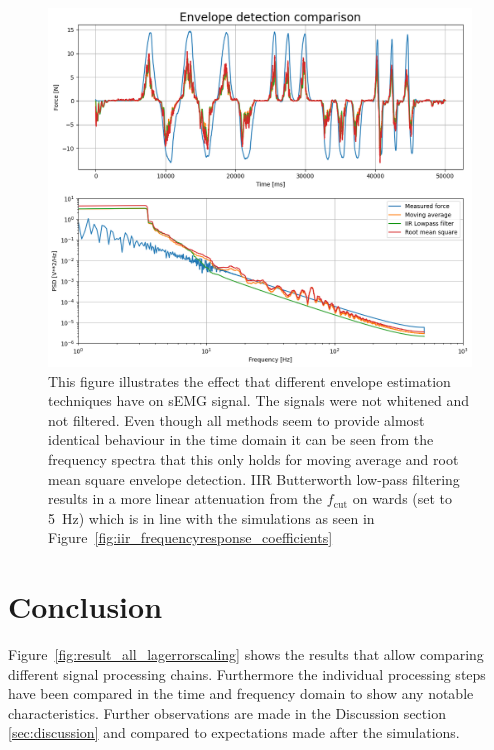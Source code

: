 \begin{figure}[h!t]
	\begin{center}
		\includegraphics[width=1.0\columnwidth]{images/measurement_envelopes.png}
	\end{center}
	\caption{This figure illustrates the effect that different envelope estimation techniques have on sEMG signal. The signals were not whitened and not filtered. Even though all methods seem to provide almost identical behaviour in the time domain it can be seen from the frequency spectra that this only holds for moving average and root mean square envelope detection. IIR Butterworth low-pass filtering results in a more linear attenuation from the $f_\text{cut}$ on wards (set to \SI{5}{\hertz}) which is in line with the simulations as seen in Figure~\ref{fig:iir_frequencyresponse_coefficients}}
	\label{fig:result_envelopes}
\end{figure}


\section{Conclusion}
Figure~\ref{fig:result_all_lagerrorscaling} shows the results that allow comparing different signal processing chains. Furthermore the individual processing steps have been compared in the time and frequency domain to show any notable characteristics. Further observations are made in the Discussion section \ref{sec:discussion} and compared to expectations made after the simulations.